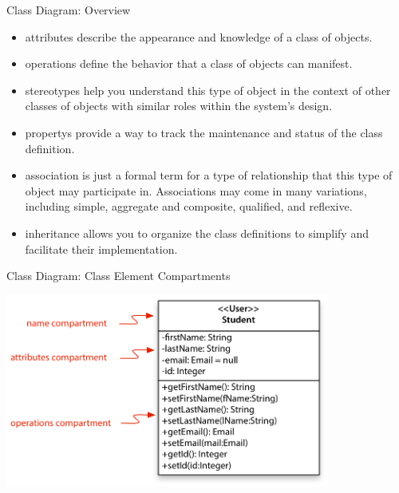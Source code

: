 \begin{frame}{Class Diagram: Overview}
    \begin{itemize}
       \item \Glspl{attribute} describe the appearance and knowledge of a class of objects.
       \item \Glspl{operation} define the behavior that a class of objects can manifest.
       \item \Glspl{stereotype} help you understand this type of object in the context of other classes 
                of objects with similar roles within the system’s design.
        \item \Glspl{property} provide a way to track the maintenance and status of the class definition.
        \item \Gls{association} is just a formal term for a type of relationship that this type of object may participate in. 
                 Associations may come in many variations, including simple, aggregate and composite, qualified, and reflexive.
         \item \Gls{inheritance} allows you to organize the class definitions to simplify and facilitate their implementation.
   \end{itemize}
\end{frame}

\begin{frame}{Class Diagram: Class Element Compartments}
\begin{center}
  \includegraphics[height=180pt]{compartments.png}
\end{center}
  
\end{frame}

